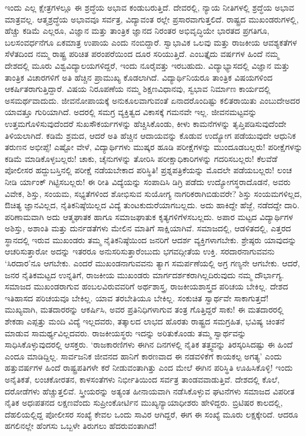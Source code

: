 ಇಂದು ಎಲ್ಲ ಕ್ಷೇತ್ರಗಳಲ್ಲೂ ಈ ಶ್ರದ್ಧೆಯ ಅಭಾವ ಕಂಡುಬರುತ್ತಿದೆ. ದೇವರಲ್ಲಿ, ನ್ಯಾಯ ನೀತಿಗಳಲ್ಲಿ ಶ್ರದ್ಧೆಯ ಅಭಾವ ಮಾತ್ರವಲ್ಲ. ಆತ್ಮಶ್ರದ್ಧೆಯ ಅಭಾವವೂ ಸರ್ವತ್ರ, ವಿದ್ಯಾವಂತ ರಲ್ಲೇ ಪ್ರಸಾರವಾಗುತ್ತಲಿದೆ. ರಾಷ್ಟ್ರದ ಮುಖಂಡರುಗಳಲ್ಲಿ, ಹೆಚ್ಚು ಕಡಿಮೆ ಎಲ್ಲರೂ, ವಿಜ್ಞಾನ ಮತ್ತು ತಾಂತ್ರಿಕ ಜ್ಞಾನದ ನಿರಂತರ ಅಭಿವೃದ್ಧಿಯೇ ಭಾರತದ ಪ್ರಗತಿಗೂ, ಬಲಸಂವರ್ಧನೆಗೂ ಏಕಮಾತ್ರ ಉಪಾಯ ಎಂದು ನಂಬಿದ್ದಾರೆ. ಸ್ವಾಭಾವಿಕ ಒಲವು ಮತ್ತು ರಾಜಕೀಯ ಆವಶ್ಯಕತೆಗಳ ಸೆಳೆತದಿಂದ ನಮ್ಮ ರಾಷ್ಟ್ರ ಪರಿಚಿತ ಪರಂಪರೆಯಿಂದ ದೂರ ಸರಿಯುತ್ತಿದೆ. ಎಂಬತ್ತೈದು ವರ್ಷಗಳ ಹಿಂದೆ ನಮ್ಮ ದೇಶದಲ್ಲಿ ಮೂರು ವಿಶ್ವವಿದ್ಯಾಲಯಗಳಿದ್ದರೆ, ಇಂದು ನೂರೈವತ್ತು ಇರಬಹುದು. ವಿದ್ಯಾಭ್ಯಾಸದಲ್ಲಿ ವಿಜ್ಞಾನ ಮತ್ತು ತಾಂತ್ರಿಕ ವಿಚಾರಗಳಿಗೆ ಅತಿ ಹೆಚ್ಚಿನ ಪ್ರಾಮುಖ್ಯ ಕೊಡಲಾಗಿದೆ. ವಿದ್ಯಾರ್ಥಿನಿಯರೂ ತಾಂತ್ರಿಕ ವಿಷಯಗಳಿಂದ ಆಕರ್ಷಿತರಾಗುತ್ತಿದ್ದಾರೆ. ವಿಷಯ ನಿರೂಪಣೆಯ ನಮ್ಮ ಶಿಕ್ಷಣವಿಧಾನವು, ಸ್ವಭಾವ ನಿರ್ಮಾಣ ಕಾರ್ಯದಲ್ಲಿ ಅಸಮರ್ಥವಾದುದು. ಜೀವನೋಪಾಯಕ್ಕೆ ಅನುಕೂಲವಾಗುವಂತೆ ಏನಾದರೊಂದಿಷ್ಟು ಕಲಿತರಾಯಿತು ಎಂಬುದೇ\break ಅದರ ಯಾವತ್ತೂ ಗುರಿಯಾಗಿದೆ. ಅದರಲ್ಲಿ ಸಮಗ್ರ ವ್ಯಕ್ತಿತ್ವದ ವಿಕಾಸಕ್ಕೆ ಗಮನವೇ ಇಲ್ಲ. ಜೀವನಮಟ್ಟವನ್ನು ಉತ್ತಮಗೊಳಿಸುವುದೆಂದರೆ ಸುಖಸೌಕರ್ಯಗಳನ್ನು ಹೆಚ್ಚಿಸಿಕೊಂಡು, ಕೀಳು ಕಾಮನೆಗಳನ್ನು ತೃಪ್ತಿಪಡಿಸುವುದೆಂದೇ ತಿಳಿಯಲಾಗಿದೆ. ಕಡಿಮೆ ಶ್ರಮದ, ಆದರೆ ಅತಿ ಹೆಚ್ಚಿನ ಆದಾಯವನ್ನು ಕೊಡುವ ಉದ್ಯೋಗ ಪಡೆಯುವುದೇ ಆಧುನಿಕ ತರುಣನ ಅಭೀಪ್ಸೆ! ಎಷ್ಟೋ ವೇಳೆ, ವಿದ್ಯಾರ್ಥಿಗಳು ಮುಷ್ಕರ ಹೂಡಿ ಪರೀಕ್ಷೆಗಳನ್ನು ಮುಂದೂಡಬಲ್ಲರು! ಪರೀಕ್ಷೆಗಳನ್ನು ಕಡಿಮೆ ಮಾಡಿಕೊಳ್ಳಬಲ್ಲರು! ಚಾಕು, ಚೈನುಗಳನ್ನು ತೋರಿಸಿ ಪರೀಕ್ಷಾಧಿಕಾರಿಗಳನ್ನು ಗದರಿಸ\-ಬಲ್ಲರು! ಕೆಲವೆಡೆ ಪೋಲೀಸರ ಹದ್ದುಬಸ್ತಿನಲ್ಲಿ ಪರೀಕ್ಷೆ ನಡೆಯಬೇಕಾದ ಪರಿಸ್ಥಿತಿ! ಪ್ರಶ್ನಪತ್ರಿಕೆಯನ್ನು ಮೊದಲೇ ಪಡೆಯಬಲ್ಲರು! ಲಂಚ ನೀಡಿ ರ್ಯಾಂಕ್ ಗಿಟ್ಟಿಸಬಲ್ಲರು! ಈ ರೀತಿ ವಿದ್ಯೆಯನ್ನು ಸಂಪಾದಿಸಿ ಡಿಗ್ರಿ ಪಡೆದು ಉದ್ಯೋಗಸ್ಥರಾದೊಡನೆ, ಅವರು ವಿವೇಕ, ಶಿಸ್ತು, ಸಂಯಮ, ಸಭ್ಯತೆಗಳಿಂದ ಶೋಭಿಸುವ ಸುಯೋಗ್ಯ ನಾಗರಿಕರಾಗಿಬಿಡುವರೇ? ಶಿಸ್ತು ಸಂಯಮಗಳಿಲ್ಲದ, ಔಚಿತ್ಯ ಜ್ಞಾನವಿಲ್ಲದ, ನೈತಿಕನಿಷ್ಠೆಯಿಲ್ಲದ ವಿದ್ಯೆ ತುಂಟಕುದುರೆಯಾಗಬಲ್ಲದು. ಅದು ಹಾಕಿದ್ದೇ ಹೆಜ್ಜೆ, ನಡೆದದ್ದೇ ದಾರಿ. ಪರಿಣಾಮವಾಗಿ ಅದು ಆತ್ಮಘಾತಕ ಹಾಗೂ ಸಮಾಜಘಾತುಕ ಕೃತ್ಯಗಳಿಗೆಳಸಬಲ್ಲದು. ಅಪಾರ ಮಟ್ಟದ ವಿದ್ಯಾರ್ಥಿಗಳ ಅಶಿಸ್ತು, ಅಶಾಂತಿ ಮತ್ತು ದುರ್ನಡತೆಗಳು ಮೇಲಿನ ಮಾತಿಗೆ ಸಾಕ್ಷಿಯಾಗಿವೆ. ಸಮಾಜದಲ್ಲಿ, ಆಡಳಿತದಲ್ಲಿ, ಎತ್ತರದ ಸ್ಥಾನದಲ್ಲಿ ಇರುವ ಮುಖಂಡರು ತಮ್ಮ ನೈತಿಕನಿಷ್ಠೆಯಿಂದ ಜನರಿಗೆ ಆದರ್ಶ ವ್ಯಕ್ತಿಗಳಾಗಬೇಕು. ಶ್ರೇಷ್ಠರು ಯಾವುದನ್ನು ಆಚರಿಸುತ್ತಾರೋ ಅದನ್ನು ಇತರರೂ ಅನುಸರಿಸುತ್ತಾರೆಂಬುದು ಭಗವದ್ಗೀತೆಯ ಉಕ್ತಿ. ಸರದಾರನಾಗುವವನು ‘ಸಿರದಾರ’ನೂ ಆಗಬೇಕು. ಎಂದರೆ ಮುಖಂಡನಾಗುವವನು ತ್ಯಾಗ ಸಮರ್ಪಣೆಯಲ್ಲಿ ಅಗ್ರ ಗಣ್ಯನೇ ಆಗಬೇಕು. ಆದರೆ, ಜನರ ನೈತಿಕಮಟ್ಟದ ಉನ್ನತಿಗೆ, ರಾಜಕೀಯ ಮುಖಂಡರು ಮಾರ್ಗದರ್ಶಕರಾಗಿಲ್ಲದಿರುವುದು ನಮ್ಮ ದೌರ್ಭಾಗ್ಯ. ಸಮಾಜದ ಮುಖಂಡರಾಗುವ ಹಂಬಲವಿರುವವರಿಗೆ ಅರ್ಥಶಾಸ್ತ್ರ, ರಾಜಕೀಯಶಾಸ್ತ್ರದ ಪರಿಚಯ ಬೇಕಿಲ್ಲ. ದೇಶದ ಇತಿಹಾಸದ ಪರಿಚಯವೂ ಬೇಕಿಲ್ಲ. ಯಾವ ತರಬೇತಿಯೂ ಬೇಕಿಲ್ಲ. ಸಂಕುಚಿತ ಸ್ವಾರ್ಥವೇ ಸಾಕಾಗುತ್ತದೆ! ಮುಖ್ಯವಾಗಿ, ಮತದಾರರನ್ನು ಆಕರ್ಷಿಸಿ, ಅವರ ಪ್ರತಿನಿಧಿಗಳಾಗುವ ತಂತ್ರ ಗೊತ್ತಿದ್ದರೆ ಸಾಕು! ಈ ಮತದಾರರಲ್ಲಿ ಶೇಕಡಾ ಎಪ್ಪತ್ತು ಮಂದಿ ವಿದ್ಯೆ ಇಲ್ಲದವರು, ತತ್ಕಾಲದ ಲಾಭದ ಹೊರತು ರಾಷ್ಟ್ರದ ಸಮಗ್ರಹಿತ, ಭವಿಷ್ಯ ಚಿಂತನೆ ಮಾಡುವ ಸಾಮರ್ಥ್ಯವಿಲ್ಲದವರು. ರಾಜಕೀಯಸ್ಥರು ಇದನ್ನು ಅರಿತುಕೊಂಡು ತಮ್ಮ ಸ್ವಾರ್ಥವನ್ನು ಸಾಧಿಸಿಕೊಳ್ಳುವುದರಲ್ಲಿ ಆಸಕ್ತರು. ‘ರಾಜಕಾರಣಿಗಳು ಈಗಿನ ದಿನಗಳಲ್ಲಿ ನೈತಿಕ ತತ್ತ್ವವನ್ನು ತಿರಸ್ಕರಿಸಿದಷ್ಟು ಈ ಹಿಂದೆ ಎಂದೂ ಮಾಡಿದ್ದಿಲ್ಲ. ಸಾರ್ವಜನಿಕ ಜೀವನದ ಹಾನಿಗೆ ಕಾರಣವಾದ ಈ ನಡವಳಿಕೆಗೆ ಕಾಯಕಲ್ಪ ಅಗತ್ಯ’ ಎಂದು ಹತ್ತುವರ್ಷಗಳ ಹಿಂದೆ ರಾಷ್ಟ್ರಪತಿಗಳೇ ಕರೆ ನೀಡುವಂತಾಗಿತ್ತು ಎಂದ ಮೇಲೆ ಈಗಿನ ಪರಿಸ್ಥಿತಿ ಊಹಿಸಿಕೊಳ್ಳಿ! ಇಂದು ಅನೈತಿಕತೆ, ಲಂಚಕೋರತನ, ಕಾಳಸಂತೆಗಳು ನಿರ್ಭೀತಿಯಿಂದ ಸರ್ವತ್ರ ತಾಂಡವವಾಡುತ್ತಿವೆ. ದೇಶದಲ್ಲಿ ಕೊಲೆ, ದರೋಡೆಗಳು ಹೆಚ್ಚುತ್ತಲಿವೆ. ಸ್ತ್ರೀಯರನ್ನು ಅತ್ಯಂತ ಹೀನಾಯವಾಗಿ ನಡೆಸಿಕೊಳ್ಳುವ ಘಟನೆಗಳು ಸಮಾಜದ ವಿಪರೀತ ನೈತಿಕ ಅಧಃಪತನದ ಲಕ್ಷಣವೆಂದು ಸುಪ್ರೀಂಕೋರ್ಟಿನ ಮುಖ್ಯನ್ಯಾಯಾಧೀಶರು ಹೇಳಿದ್ದರು. ಬ್ರಿಟಿಷರ ಕಾಲದಲ್ಲಿ, ದೆಹಲಿಯಲ್ಲಿದ್ದ ಪೋಲೀಸರ ಸಂಖ್ಯೆ ಕೇವಲ ಒಂದು ಸಾವಿರ ಆಗಿದ್ದರೆ, ಈಗ ಈ ಸಂಖ್ಯೆ ಮೂರು ಲಕ್ಷಕ್ಕೇರಿದೆ. ಆದರೂ ಹಗಲಿನಲ್ಲೇ ಹೆಂಗಸು ಒಬ್ಬಳೇ ತಿರುಗಲು ಹೆದರುವಂತಾಗಿದೆ!


